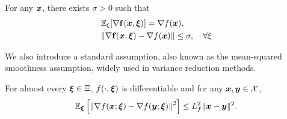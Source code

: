 \documentclass[10pt]{article}
\begin{document}
\begin{assumption}
     \label{Ass: bounded stochastic gradient noise}
     For any \(\bm{x}\), there exists $\sigma > 0$ such that 
     \begin{align}
      &\mathbb{E}_{\xi}[\nabla \mathbf f(\bm{x}, \bm{\xi})] = \nabla f(\bm{x}), \notag \\
    & \| \nabla  \mathbf f(\bm{x}, \bm{\xi}) - \nabla f(\bm{x}) \| \leq \sigma, \quad \forall \xi
     \end{align}
\end{assumption}
We also introduce a standard assumption, also known as the mean-squared smoothness assumption, widely used in variance reduction methods.
\begin{assumption}
    \label{Ass: the expected smoothness of f} 
    For almost every $\bm{\xi} \in \Xi$, $f(\cdot, \bm{\xi})$ is differentiable and 
    for any $\bm{x}, \bm{y} \in \mathcal{X}$,
    \[
        \mathbb{E}_{\bm{\xi}}\left[\left\|\nabla f(\bm{x}; \bm{\xi}) - \nabla f(\bm{y}; \bm{\xi})\right\|^{2}
        \right] \leq L_f^{2}\|\bm{x} - \bm{y}\|^{2}.
    \]
\end{assumption}

\end{document}
